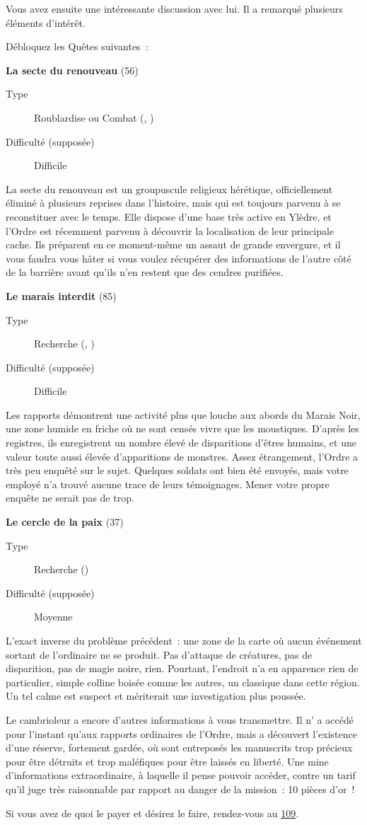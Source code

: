 \documentclass{report}
\newcommand{\glink}[1]{\hyperref[section-#1]{#1}}
\newcommand{\quest}[5]{
    \begin{mdframed}[innertopmargin=0.5cm,innerbottommargin=0.5cm,leftmargin=0.5cm,rightmargin=0.5cm]
        \begin{center}
            \textbf{#1} (#2)
        \end{center}
        \begin{description}
            \item[Type] #3
            \item[Difficulté (supposée)] #4
        \end{description}
        #5
    \end{mdframed}
}
\begin{document}
Vous avez ensuite une intéressante discussion avec lui. Il a remarqué plusieurs éléments d'intérêt.

Débloquez les Quêtes suivantes :

\quest{La secte du renouveau}{56}{Roublardise ou Combat (\ankh, \cross)}{Difficile}{
La secte du renouveau est un groupuscule religieux hérétique, officiellement éliminé à plusieurs reprises dans l'histoire, mais qui est toujours parvenu à se reconstituer avec le temps. Elle dispose d'une base très active en Ylèdre, et l'Ordre est récemment parvenu à découvrir la localisation de leur principale cache. Ils préparent en ce moment-même un assaut de grande envergure, et il vous faudra vous hâter si vous voulez récupérer des informations de l'autre côté de la barrière avant qu'ils n'en restent que des cendres purifiées.
}

\quest{Le marais interdit}{85}{Recherche (\ankh, \caduceus)}{Difficile}{
Les rapports démontrent une activité plus que louche aux abords du Marais Noir, une zone humide en friche où ne sont censés vivre que les moustiques. D'après les registres, ils enregistrent un nombre élevé de disparitions d'êtres humains, et une valeur toute aussi élevée d'apparitions de monstres. Assez étrangement, l'Ordre a très peu enquêté sur le sujet. Quelques soldats ont bien été envoyés, mais votre employé n'a trouvé aucune trace de leurs témoignages. Mener votre propre enquête ne serait pas de trop.
}

\quest{Le cercle de la paix}{37}{Recherche (\caduceus)}{Moyenne}{
L'exact inverse du problème précédent : une zone de la carte où aucun événement sortant de l'ordinaire ne se produit. Pas d'attaque de créatures, pas de disparition, pas de magie noire, rien. Pourtant, l'endroit n'a en apparence rien de particulier, simple colline boisée comme les autres, un classique dans cette région. Un tel calme est suspect et mériterait une investigation plus poussée.
}

Le cambrioleur a encore d'autres informations à vous transmettre. Il n' a accédé pour l'instant qu'aux rapports ordinaires de l'Ordre, mais a découvert l'existence d'une réserve, fortement gardée, où sont entreposés les manuscrits trop précieux pour être détruits et trop maléfiques pour être laissés en liberté. Une mine d'informations extraordinaire, à laquelle il pense pouvoir accéder, contre un tarif qu'il juge très raisonnable par rapport au danger de la mission : 10 pièces d'or !

Si vous avez de quoi le payer et désirez le faire, rendez-vous au \glink{109}.
\end{document}
